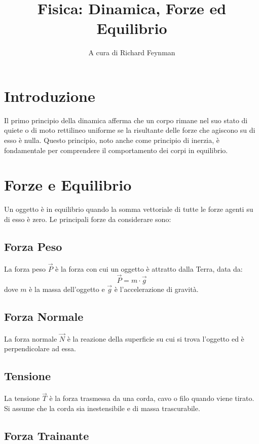 \documentclass[a4paper,12pt]{article}
\title{Fisica: Dinamica, Forze ed Equilibrio}
\author{A cura di Richard Feynman}
\date{}
\begin{document}
\maketitle
\tableofcontents
\newpage

\section{Introduzione}

Il primo principio della dinamica afferma che un corpo rimane nel suo stato di quiete o di moto rettilineo uniforme se la risultante delle forze che agiscono su di esso è nulla. Questo principio, noto anche come principio di inerzia, è fondamentale per comprendere il comportamento dei corpi in equilibrio.

\section{Forze e Equilibrio}

Un oggetto è in equilibrio quando la somma vettoriale di tutte le forze agenti su di esso è zero. Le principali forze da considerare sono:

\subsection{Forza Peso}

La forza peso $\vec{P}$ è la forza con cui un oggetto è attratto dalla Terra, data da:
\[
\vec{P} = m \cdot \vec{g}
\]
dove $m$ è la massa dell'oggetto e $\vec{g}$ è l'accelerazione di gravità.

\subsection{Forza Normale}

La forza normale $\vec{N}$ è la reazione della superficie su cui si trova l'oggetto ed è perpendicolare ad essa.

\subsection{Tensione}

La tensione $\vec{T}$ è la forza trasmessa da una corda, cavo o filo quando viene tirato. Si assume che la corda sia inestensibile e di massa trascurabile.

\subsection{Forza Trainante}
\end{document}
